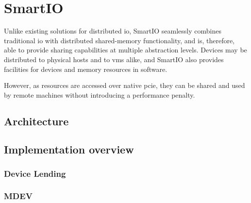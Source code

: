 \chapter{SmartIO}\label{chapter:smartio}

Unlike existing solutions for distributed \gls{io}, SmartIO seamlessly combines traditional \gls{io} with distributed shared-memory functionality, and is, therefore, able to provide sharing capabilities at multiple abstraction levels.
Devices may be distributed to physical hosts and to \glspl{vm} alike, and SmartIO also provides facilities for  devices and memory resources in software.


However, as resources are accessed over native \gls{pcie}, they can be shared and used by remote machines without introducing a performance penalty.
\section{Architecture}\label{sec:overview}

\section{Implementation overview}\label{sec:impl}
\subsection{Device Lending}
\subsection{MDEV}
